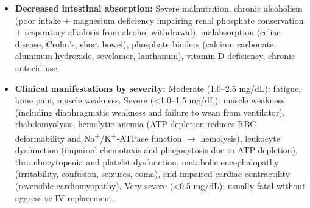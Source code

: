 \begin{itemize}
  \item \textbf{Decreased intestinal absorption:} Severe malnutrition, chronic alcoholism (poor intake + magnesium deficiency impairing renal phosphate conservation + respiratory alkalosis from alcohol withdrawal), malabsorption (celiac disease, Crohn's, short bowel), phosphate binders (calcium carbonate, aluminum hydroxide, sevelamer, lanthanum), vitamin D deficiency, chronic antacid use.
  \item \textbf{Clinical manifestations by severity:} Moderate (1.0--2.5 mg/dL): fatigue, bone pain, muscle weakness. Severe (<1.0--1.5 mg/dL): muscle weakness (including diaphragmatic weakness and failure to wean from ventilator), rhabdomyolysis, hemolytic anemia (ATP depletion reduces RBC deformability and Na\textsuperscript{+}/K\textsuperscript{+}-ATPase function $\rightarrow$ hemolysis), leukocyte dysfunction (impaired chemotaxis and phagocytosis due to ATP depletion), thrombocytopenia and platelet dysfunction, metabolic encephalopathy (irritability, confusion, seizures, coma), and impaired cardiac contractility (reversible cardiomyopathy). Very severe (<0.5 mg/dL): usually fatal without aggressive IV replacement.
\end{itemize}

